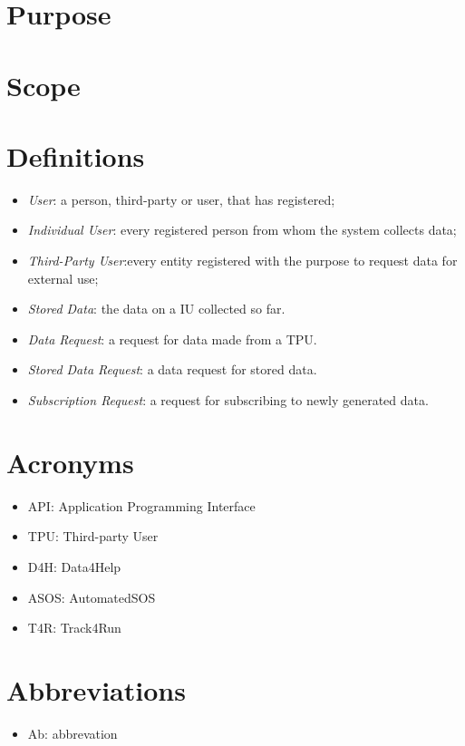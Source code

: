 \section{Purpose}
\section{Scope}
\section{Definitions}
\begin{itemize}
\item \textit{User}: a person, third-party or user, that has registered;
\item \textit{Individual User}: every registered person from whom the system collects data; 
\item \textit{Third-Party User}:every entity registered with the purpose to request data for external use;
\item \textit{Stored Data}: the data on a IU collected so far.
\item \textit{Data Request}: a request for data made from a TPU.
\item \textit{Stored Data Request}: a data request for stored data.
\item \textit{Subscription Request}: a request for subscribing to newly generated data.
\end{itemize}
\section{Acronyms}
\begin{itemize}
\item API: Application Programming Interface
\item TPU: Third-party User
\item	D4H: Data4Help
\item	ASOS: AutomatedSOS
\item	T4R: Track4Run
\end{itemize}

\section{Abbreviations}
\begin{itemize}
\item Ab: abbrevation
\end{itemize}

